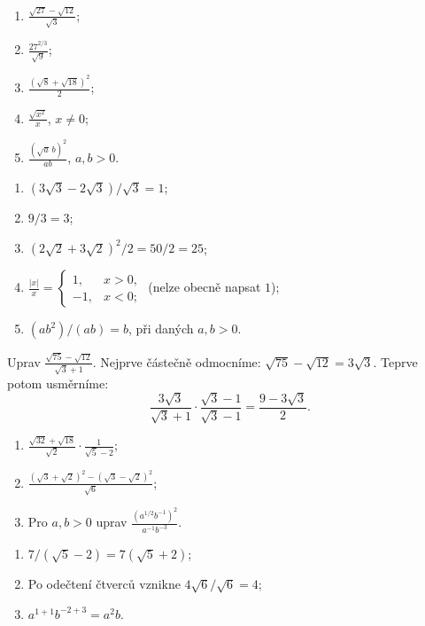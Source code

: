 \documentclass[11pt,a4paper]{article}
\begin{document}
\begin{zadaniReseniBox}[breakable=false,title={Samostatná práce 3: smíšené úpravy}]
\begin{enumerate}[label=\alph*)]
\item $\displaystyle\frac{\sqrt{27}-\sqrt{12}}{\sqrt3}$;
\item $\displaystyle\frac{27^{2/3}}{\sqrt9}$;
\item $\displaystyle\frac{(\sqrt8+\sqrt{18})^2}{2}$;
\item $\displaystyle\frac{\sqrt{x^2}}x$, $x\ne0$;
\item $\displaystyle\frac{(\sqrt a\,b)^2}{ab}$, $a,b>0$.
\end{enumerate}
\tcblower
\begin{enumerate}[label=\alph*)]
\item $(3\sqrt3-2\sqrt3)/\sqrt3=\boxed1$;
\item $9/3=\boxed3$;
\item $(2\sqrt2+3\sqrt2)^2/2=50/2=\boxed{25}$;
\item $\displaystyle\frac{|x|}x=\begin{cases}1,&x>0,\\-1,&x<0;\end{cases}$
\quad(nelze obecně napsat $1$);
\item $(ab^2)/(ab)=\boxed b$, při daných $a,b>0$.
\end{enumerate}
\end{zadaniReseniBox}

\begin{prikladReseniBox}[breakable=false,title={Příklad 4: kdy se vyplatí jeden velký krok?}]
Uprav $\displaystyle
\frac{\sqrt{75}-\sqrt{12}}{\sqrt3+1}$.
\tcblower
Nejprve částečně odmocníme: $\sqrt{75}-\sqrt{12}=3\sqrt3$.
Teprve potom usměrníme:
\[
\frac{3\sqrt3}{\sqrt3+1}\cdot\frac{\sqrt3-1}{\sqrt3-1}
=\boxed{\frac{9-3\sqrt3}{2}}.
\]
\end{prikladReseniBox}

\begin{zadaniReseniBox}[breakable=false,title={Rozšiřující příklad 1: porovnej strategie}]
\begin{enumerate}[label=\alph*)]
\item $\displaystyle\frac{\sqrt{32}+\sqrt{18}}{\sqrt2}
\cdot\frac1{\sqrt5-2}$;
\item $\displaystyle\frac{(\sqrt3+\sqrt2)^2-(\sqrt3-\sqrt2)^2}{\sqrt6}$;
\item Pro $a,b>0$ uprav $\displaystyle\frac{(a^{1/2}b^{-1})^2}{a^{-1}b^{-3}}$.
\end{enumerate}
\tcblower
\begin{enumerate}[label=\alph*)]
\item $7/(\sqrt5-2)=\boxed{7(\sqrt5+2)}$;
\item Po odečtení čtverců vznikne $4\sqrt6/\sqrt6=\boxed4$;
\item $a^{1+1}b^{-2+3}=\boxed{a^2b}$.
\end{enumerate}
\end{zadaniReseniBox}
\end{document}
